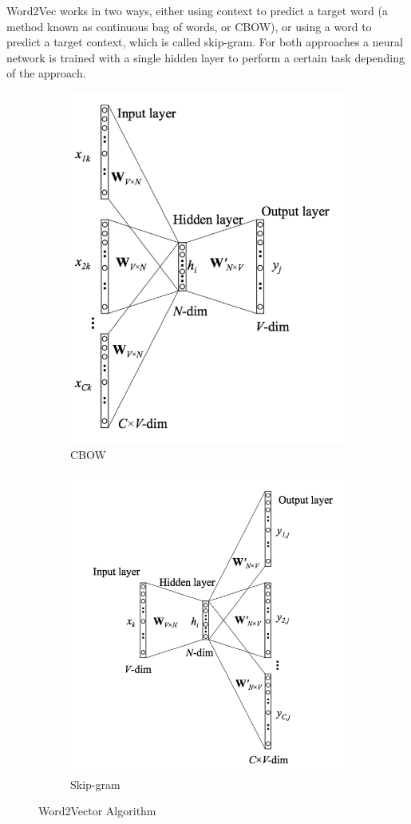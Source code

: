 \documentclass[]{article}
\begin{document}
Word2Vec works in two ways, either using context to predict a target word (a method known as continuous bag of words, or CBOW), or using a word to predict a target context, which is called skip-gram. For both approaches a neural network is trained with a single hidden layer to perform a certain task depending of the approach. 

\begin{figure}
	\begin{subfigure}{.5\textwidth}
		\centering
		\includegraphics[width=.8\linewidth]{Figures/CBOW}
		\caption{CBOW}
		\label{fig:sfig1}
	\end{subfigure}%
	\begin{subfigure}{.5\textwidth}
		\centering
		\includegraphics[width=.8\linewidth]{Figures/Skip}
		\caption{Skip-gram}
		\label{fig:sfig2}
	\end{subfigure}
	\caption{Word2Vector Algorithm}
	\label{fig:fig}
\end{figure}
\end{document}
